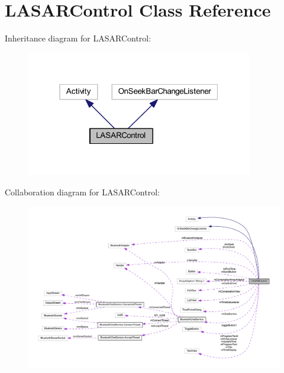 \hypertarget{classcom_1_1example_1_1android_1_1_bluetooth_chat_1_1_l_a_s_a_r_control}{\section{L\-A\-S\-A\-R\-Control Class Reference}
\label{classcom_1_1example_1_1android_1_1_bluetooth_chat_1_1_l_a_s_a_r_control}
}


Inheritance diagram for L\-A\-S\-A\-R\-Control\-:
\nopagebreak
\begin{figure}[H]
\begin{center}
\leavevmode
\includegraphics[width=280pt]{classcom_1_1example_1_1android_1_1_bluetooth_chat_1_1_l_a_s_a_r_control__inherit__graph}
\end{center}
\end{figure}


Collaboration diagram for L\-A\-S\-A\-R\-Control\-:
\nopagebreak
\begin{figure}[H]
\begin{center}
\leavevmode
\includegraphics[width=350pt]{classcom_1_1example_1_1android_1_1_bluetooth_chat_1_1_l_a_s_a_r_control__coll__graph}
\end{center}
\end{figure}

